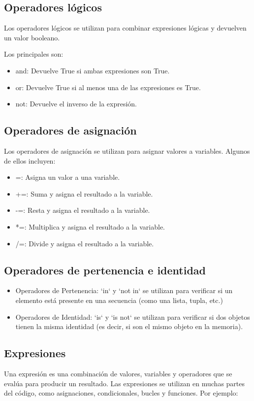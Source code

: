 \subsection{Operadores lógicos}
Los operadores lógicos se utilizan para combinar expresiones lógicas y devuelven un valor booleano. 

Los principales son:
\begin{itemize}
    \item and: Devuelve True si ambas expresiones son True.
    \item or: Devuelve True si al menos una de las expresiones es True.
    \item not: Devuelve el inverso de la expresión.
\end{itemize}

\subsection{Operadores de asignación}
Los operadores de asignación se utilizan para asignar valores a variables. Algunos de ellos incluyen:
\begin{itemize}
    \item =: Asigna un valor a una variable.
    \item +=: Suma y asigna el resultado a la variable.
    \item -=: Resta y asigna el resultado a la variable.
    \item *=: Multiplica y asigna el resultado a la variable.
    \item /=: Divide y asigna el resultado a la variable.
\end{itemize}

\subsection{Operadores de pertenencia e identidad}
\begin{itemize}
    \item Operadores de Pertenencia: `in` y `not in` se utilizan para verificar si un elemento está presente en una secuencia (como una lista, tupla, etc.)
    \item Operadores de Identidad: `is` y `is not` se utilizan para verificar si dos objetos tienen la misma identidad (es decir, si son el mismo objeto en la memoria).
\end{itemize}

\subsection{Expresiones}
Una expresión es una combinación de valores, variables y operadores que se evalúa para producir un resultado. Las expresiones se utilizan en muchas partes del código, como asignaciones, condicionales, bucles y funciones. Por ejemplo:\\

